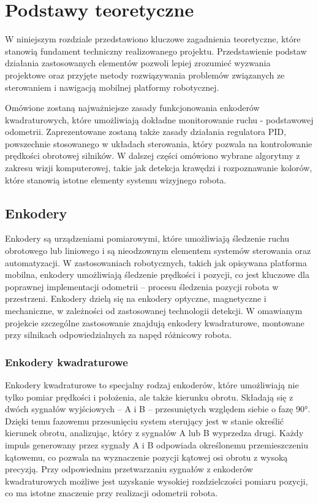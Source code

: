 \chapter{Podstawy teoretyczne}
\label{ch:podstawy-teoretyczne}

W niniejszym rozdziale przedstawiono kluczowe zagadnienia teoretyczne, które stanowią fundament techniczny realizowanego projektu. Przedstawienie podstaw działania zastosowanych elementów pozwoli lepiej zrozumieć wyzwania projektowe oraz przyjęte metody rozwiązywania problemów związanych ze sterowaniem i nawigacją mobilnej platformy robotycznej. 

Omówione zostaną najważniejsze zasady funkcjonowania enkoderów kwadraturowych, które umożliwiają dokładne monitorowanie ruchu - podstawowej odometrii. Zaprezentowane zostaną także zasady działania regulatora PID, powszechnie stosowanego w układach sterowania, który pozwala na kontrolowanie prędkości obrotowej silników. W dalszej części omówiono wybrane algorytmy z zakresu wizji komputerowej, takie jak detekcja krawędzi i rozpoznawanie kolorów, które stanowią istotne elementy systemu wizyjnego robota.

\section{Enkodery}

Enkodery są urządzeniami pomiarowymi, które umożliwiają śledzenie ruchu obrotowego lub liniowego i są nieodzownym elementem systemów sterowania oraz automatyzacji. W zastosowaniach robotycznych, takich jak opisywana platforma mobilna, enkodery umożliwiają śledzenie prędkości i pozycji, co jest kluczowe dla poprawnej implementacji odometrii – procesu śledzenia pozycji robota w przestrzeni. Enkodery dzielą się na enkodery optyczne, magnetyczne i mechaniczne, w zależności od zastosowanej technologii detekcji. W omawianym projekcie szczególne zastosowanie znajdują enkodery kwadraturowe, montowane przy silnikach odpowiedzialnych za napęd różnicowy robota.

\subsection{Enkodery kwadraturowe}

Enkodery kwadraturowe to specjalny rodzaj enkoderów, które umożliwiają nie tylko pomiar prędkości i położenia, ale także kierunku obrotu. Składają się z dwóch sygnałów wyjściowych – A i B – przesuniętych względem siebie o fazę 90°. Dzięki temu fazowemu przesunięciu system sterujący jest w stanie określić kierunek obrotu, analizując, który z sygnałów A lub B wyprzedza drugi. Każdy impuls generowany przez sygnały A i B odpowiada określonemu przemieszczeniu kątowemu, co pozwala na wyznaczenie pozycji kątowej osi obrotu z wysoką precyzją. Przy odpowiednim przetwarzaniu sygnałów z enkoderów kwadraturowych możliwe jest uzyskanie wysokiej rozdzielczości pomiaru pozycji, co ma istotne znaczenie przy realizacji odometrii robota.

